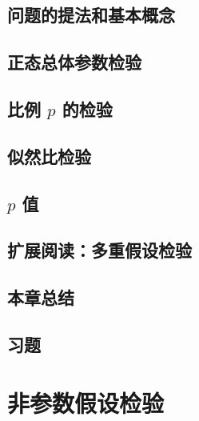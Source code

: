 \documentclass[UTF8,12pt,a4paper,fontset=fandol]{ctexbook}
\begin{document}
\section{问题的提法和基本概念}
\label{sec:study-testing-concepts}

\section{正态总体参数检验}
\label{sec:study-normal-tests}

\section{比例 $p$ 的检验}
\label{sec:study-proportion-test}

\section{似然比检验}
\label{sec:study-likelihood-ratio}

\section{$p$ 值}
\label{sec:study-p-value}

\section{扩展阅读：多重假设检验}
\label{sec:study-multiple-testing}

\section*{本章总结}

\section*{习题}

\chapter{非参数假设检验}
\label{chap:study-nonparametric-testing}
\end{document}
